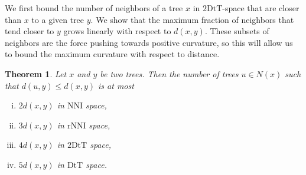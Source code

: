 \documentclass{amsart}
\newtheorem{theorem}[lemma]{Theorem}
\theoremstyle{definition}
\newcommand{\dts}{\mathrm{2DtT}}
\newcommand{\nni}{\mathrm{NNI}}
\newcommand{\rnni}{\mathrm{rNNI}}
\newcommand{\mdts}{\mathrm{DtT}}
\begin{document}
We first bound the number of neighbors of a tree $x$ in $\dts$-space that are closer than $x$ to a given tree $y$.
We show that the maximum fraction of neighbors that tend closer to $y$ grows linearly with respect to $d(x,y)$.
These subsets of neighbors are the force pushing towards positive curvature, so this will allow us to bound the maximum curvature with respect to distance.

\begin{theorem}
\label{max_good_neighbours}
Let $x$ and $y$ be two trees.
Then the number of trees $u \in N(x)$ such that $d(u, y) \le d(x, y)$ is at most
\begin{enumerate}[(i)]
\item $2d(x,y)$ in $\nni$ space,
\item $3d(x,y)$ in $\rnni$ space,
\item $4d(x,y)$ in $\dts$ space,
\item $5d(x,y)$ in $\mdts$ space.
\end{enumerate}
\end{theorem}
\end{document}
